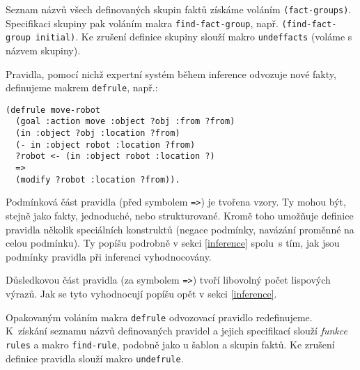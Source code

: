 Seznam názvů všech definovaných skupin faktů získáme voláním
\verb|(fact-groups)|. Specifikaci skupiny pak voláním makra
\verb|find-fact-group|, např. \verb|(find-fact-group initial)|. Ke zrušení
definice skupiny slouží makro \verb|undeffacts| (voláme s názvem skupiny).

Pravidla, pomocí nichž expertní systém během inference odvozuje nové fakty,
definujeme makrem
\verb|defrule|, např.:
\begin{verbatim}
(defrule move-robot
  (goal :action move :object ?obj :from ?from)
  (in :object ?obj :location ?from)
  (- in :object robot :location ?from)
  ?robot <- (in :object robot :location ?)
  =>
  (modify ?robot :location ?from)).
\end{verbatim}
Podmínková část pravidla (před symbolem \verb|=>|) je tvořena vzory. Ty mohou
být, stejně jako fakty, jednoduché, nebo strukturované. Kromě toho umožňuje
definice pravidla několik speciálních konstruktů (negace podmínky, navázání
proměnné na celou podmínku). Ty popíšu podrobně v sekci \ref{inference} spolu~s
tím, jak jsou podmínky pravidla při inferenci vyhodnocovány.

Důsledkovou část pravidla (za symbolem \verb|=>|) tvoří libovolný počet
lispových výrazů. Jak se tyto vyhodnocují popíšu opět v sekci \ref{inference}.

Opakovaným voláním makra \verb|defrule| odvozovací pravidlo redefinujeme.
K~získání seznamu názvů definovaných pravidel a jejich specifikací slouží
\emph{funkce} \verb|rules| a makro \verb|find-rule|, podobně jako u šablon a
skupin faktů.  Ke zrušení definice pravidla slouží makro \verb|undefrule|.

\FloatBarrier
